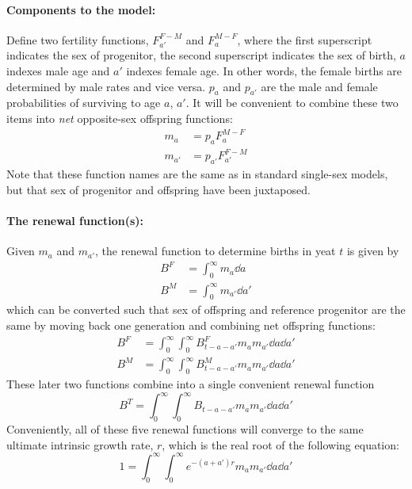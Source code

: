 \label{sec:pollardage}
\paragraph{Components to the model: }
Define two fertility functions, $F_{a'}^{F-M}$ and $F_a^{M-F}$, where the first
superscript indicates the sex of progenitor, the second superscript indicates
the sex of birth, $a$ indexes male age and $a'$ indexes female age. In
other words, the female births are determined by male rates and vice versa.
$p_a$ and $p_{a'}$ are the male and female probabilities of surviving to age 
$a$, $a'$. It will be convenient to combine these two items into \textit{net}
opposite-sex offspring functions:
\begin{align}
m_a &= p_aF_a^{M-F}\\
m_{a'} &= p_{a'}F_{a'}^{F-M}
\end{align}
Note that these function names are the same as in standard single-sex models,
but that sex of progenitor and offspring have been juxtaposed.
\paragraph{The renewal function(s): }
Given $m_a$ and $m_{a'}$, the renewal function to determine births in yeat $t$
is given by
\begin{align}
B^F &= \int_0^\infty m_a \dd a\\
B^M &= \int_0^\infty m_{a'} \dd a'
\end{align}
which can be converted such that sex of offspring and reference
progenitor are the same by moving back one generation and combining net
offspring functions:
\begin{align}
B^F &= \int_0^\infty \int_0^\infty B^F_{t-a-a'} m_am_{a'}\dd a \dd a'\\
B^M &= \int_0^\infty \int_0^\infty B^M_{t-a-a'} m_am_{a'}\dd a \dd a'
\end{align}
These later two functions combine into a single convenient renewal function
\begin{equation}
B^T = \int_0^\infty \int_0^\infty B_{t-a-a'}m_am_{a'}\dd a \dd a'
\end{equation}
Conveniently, all of these five renewal functions will converge to the same
ultimate intrinsic growth rate, $r$, which is the real root of the following equation: 
\begin{equation}
1 = \int_0^\infty \int_0^\infty e^{-(a+a')r}m_am_{a'}\dd a \dd a'
\end{equation}

